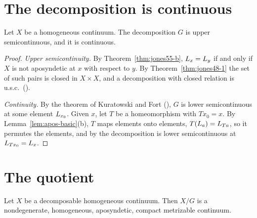 
\section{The decomposition is continuous}

\begin{theorem}[Jones 1955, p.~739]\label{thm:jones55-usc}
Let $X$ be a homogeneous continuum. The decomposition $G$ is upper semicontinuous, and it is continuous.
\end{theorem}

\begin{proof}
\emph{Upper semicontinuity.} By Theorem~\ref{thm:jones55-b}, $L_{x}=L_{y}$ if and only if $X$ is not aposyndetic
at $x$ with respect to $y$. By Theorem~\ref{thm:jones48-1} the set of such pairs is closed in $X\times X$, and a
decomposition with closed relation is u.s.c.\ ().

\emph{Continuity.} By the theorem of Kuratowski and Fort (), $G$ is lower semicontinuous at
some element $L_{x_0}$. Given $x$, let $T$ be a homeomorphism with $Tx_0=x$. By Lemma~\ref{lem:apos-basic}(b), $T$
maps elements onto elements, $T(L_{a})=L_{Ta}$, so it permutes the elements, and by  the
decomposition is lower semicontinuous at $L_{Tx_0}=L_{x}$.
\end{proof}


\section{The quotient}

\begin{theorem}\label{thm:jones55-a}
Let $X$ be a decomposable homogeneous continuum. Then $X/G$ is a nondegenerate, homogeneous, aposyndetic,
compact metrizable continuum.
\end{theorem}

